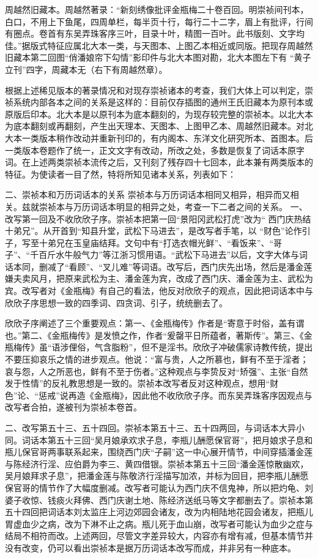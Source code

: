 \documentclass[a4paper,12pt,UTF8,twoside]{ctexbook}
\begin{document}
周越然旧藏本。周越然著录：“新刻绣像批评金瓶梅二十卷百回。明崇祯间刊本，白口，不用上下鱼尾，四周单栏，每半页十行，每行二十二字，眉上有批评，行间有圈点。卷首有东吴弄珠客序三叶，目录十叶，精图一百叶。此书版刻、文字均佳。”据版式特征应属北大本一类，与天图本、上图乙本相近或同版。把现存周越然旧藏本第二回图“俏潘娘帘下勾情”影印件与北大本图对勘，北大本图左下有 “黄子立刊”四字，周藏本无（右下有周越然章）。

根据上述稀见版本的著录情况和对现存崇祯诸本的考查，我们大体上可以判定，崇祯系统内部各本之间的关系是这样的：目前仅存插图的通州王氏旧藏本为原刊本或原版后印本。北大本是以原刊本为底本翻刻的，为现存较完整的崇祯本。以北大本为底本翻刻或再翻刻，产生出天理本、天图本、上图甲乙本、周越然旧藏本。对北大本一类版本稍作改动并重新刊印的，有内阁本、东洋文化研究所本、首图本。后一类版本卷题作了统一，正文文字有改动，所改之处，多数是恢复了词话本原字词。在上述两类崇祯本流传之后，又刊刻了残存四十七回本，此本兼有两类版本的特征。为使读者一目了然，特将所知见诸本关系，列表如下：

二、崇祯本和万历词话本的关系
崇祯本与万历词话本相同又相异，相异而又相关。兹就崇祯本与万历词话本明显的相异之处，考查一下二者之间的关系。
一、改写第一回及不收欣欣子序。崇祯本把第一回“景阳冈武松打虎”改为“ 西门庆热结十弟兄”。从开首到“知县升堂，武松下马进去”，是改写者手笔，以 “财色”论作引子，写至十弟兄在玉皇庙结拜。文句中有“打选衣帽光鲜”、“看饭来”、“哥子”、“千百斤水牛般气力”等江浙习惯用语。“武松下马进去”以后，文字大体与词话本同，删减了“看顾”、“叉儿难”等词语。改写后，西门庆先出场，然后是潘金莲嫌夫卖风月，把原来武松为主、潘金莲为宾，改成了西门庆、潘金莲为主、武松为宾。改写者对《金瓶梅》有自己的看法，他反对欣欣子的观点，因此把词话本中与欣欣子序思想一致的四季词、四贪词、引子，统统删去了。

欣欣子序阐述了三个重要观点：第一、《金瓶梅传》作者是“寄意于时俗，盖有谓也。”第二、《金瓶梅传》是发愤之作，作者“爰罄平日所蕴者，著斯传”。第三、《金瓶梅传》虽“语涉俚俗，气含脂粉”，但不是淫书。欣欣子冲破儒家诗教传统，提出不要压抑哀乐之情的进步观点。他说：“富与贵，人之所慕也，鲜有不至于淫者；哀与怨，人之所恶也，鲜有不至于伤者。”这种观点与李贽反对“矫强”、主张“自然发于性情”的反礼教思想是一致的。崇祯本改写者反对这种观点，想用“财色”论、“惩戒”说再造《金瓶梅》，因此他不收欣欣子序。而东吴弄珠客序因观点与改写者合拍，遂被刊为崇祯本卷首。

二、改写第五十三、五十四回。崇祯本第五十三、五十四两回，与词话本大异小同。词话本第五十三回“吴月娘承欢求子息，李瓶儿酬愿保官哥”，把月娘求子息和瓶儿保官哥两事联系起来，围绕西门庆“子嗣”这一中心展开情节，中间穿插潘金莲与陈经济行淫、应伯爵为李三、黄四借银。崇祯本第五十三回“潘金莲惊散幽欢，吴月娘拜求子息”，把潘金莲与陈敬济行淫描写加浓，并标为回目，把李瓶儿酬愿保官哥的情节作了大幅度删减。改写者可能认为西门庆不信鬼神，所以把灼龟、刘婆子收惊、钱痰火拜佛、西门庆谢土地、陈经济送纸马等文字都删去了。崇祯本第五十四回把词话本刘太监庄上河边郊园会诸友，改为内相陆地花园会诸友，把瓶儿胃虚血少之病，改为下淋不止之病。瓶儿死于血山崩，改写者可能认为血少之症与结局不相符而改。上述两回，尽管文字差异较大，内容亦有增有减，但基本情节并没有改变，仍可以看出崇祯本是据万历词话本改写而成，并非另有一种底本。
\end{document}
